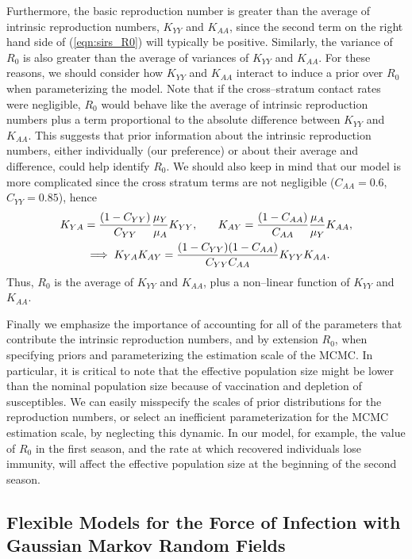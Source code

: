 Furthermore, the basic reproduction number is greater than the average of intrinsic reproduction numbers, $ K_{YY} $ and $ K_{AA} $, since the second term on the right hand side of (\ref{eqn:sirs_R0}) will typically be positive. Similarly, the variance of $ R_0 $ is also greater than the average of variances of $ K_{YY} $ and $ K_{AA} $. For these reasons, we should consider how $ K_{YY} $ and $ K_{AA} $ interact to induce a prior over $ R_0 $ when parameterizing the model. Note that if the cross--stratum contact rates were negligible, $ R_0 $ would behave like the average of intrinsic reproduction numbers plus a term proportional to the absolute difference between $ K_{YY} $ and $ K_{AA} $. This suggests that prior information about the intrinsic reproduction numbers, either individually (our preference) or about their average and difference, could help identify $ R_0 $. We should also keep in mind that our model is more complicated since the cross stratum terms are not negligible ($ C_{AA} = 0.6 $, $ C_{YY}=0.85 $), hence
\begin{align*}
K_{YA} &= \frac{(1 - C_{YY})}{C_{YY}}\frac{\mu_Y}{\mu_A}K_{YY},\hspace{0.25in}
K_{AY} = \frac{(1 - C_{AA})}{C_{AA}}\frac{\mu_A}{\mu_Y}K_{AA},\\
&\implies K_{YA}K_{AY} = \frac{(1 - C_{YY})(1-C_{AA})}{C_{YY}C_{AA}}K_{YY}K_{AA}.
\end{align*} 
Thus, $ R_0 $ is the average of $ K_{YY} $ and $ K_{AA} $, plus a non--linear function of $ K_{YY} $ and $ K_{AA} $.

Finally we emphasize the importance of accounting for all of the parameters that contribute the intrinsic reproduction numbers, and by extension $ R_0 $, when specifying priors and parameterizing the estimation scale of the MCMC. In particular, it is critical to note that the effective population size might be lower than the nominal population size because of vaccination and depletion of susceptibles. We can easily misspecify the scales of prior distributions for the reproduction numbers, or select an inefficient parameterization for the MCMC estimation scale, by neglecting this dynamic. In our model, for example, the value of $ R_0 $ in the first season, and the rate at which recovered individuals lose immunity, will affect the effective population size at the beginning of the second season. 

\subsection{Flexible Models for the Force of Infection with Gaussian Markov Random Fields}
\label{subsec:flu_gmrf}

